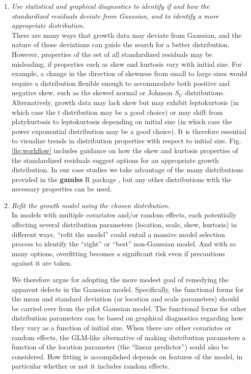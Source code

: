 \documentclass[12pt]{article}
\begin{document}
\begin{enumerate}
\item \textit{Use statistical and graphical diagnostics to identify if and how the standardized residuals deviate from Gaussian, and to identify a more appropriate distribution.}
\\
There are many ways that growth data may deviate from Gaussian, and the nature of those deviations can guide the search for a better distribution. 
However, properties of the set of all standardized residuals may be misleading, if properties such as skew and kurtosis vary with initial size. 
For example, a change in the direction of skewness from small to large sizes would require a distribution flexible enough to accommodate both positive and negative skew, such as the skewed normal or Johnson $S_{U}$ distributions. 
Alternatively, growth data may lack skew but may exhibit leptokurtosis (in which case the $t$ distribution may be a good choice) or may shift from platykurtosis to leptokurtosis depending on initial size (in which case the power exponential distribution may be a good choice). 
It is therefore essential to visualize trends in distribution properties with respect to initial size. 
Fig. \ref{fig:workflow} includes guidance on how the skew and kurtosis properties of the standardized residuals suggest options for 
an appropriate growth distribution. In our case studies we take advantage of the many distributions provided in the \textbf{gamlss} R package \citep{stasinopoulos2007generalized}, but any other distributions with the necessary properties can be used.  

\item \textit{Refit the growth model using the chosen distribution.}
\\
In models with multiple covariates and/or random effects, each potentially affecting several distribution parameters (location, scale, skew, kurtosis) in
different ways, ``refit the model'' could entail a massive model selection process to identify the ``right'' or ``best'' non-Gaussian model. 
And with so many options, overfitting becomes a significant risk even if precautions against it are taken. 

We therefore argue for adopting the more modest goal of remedying the apparent defects in the Gaussian model. Specifically, the functional forms
for the mean and standard deviation (or location and scale parameters) should be carried over from the pilot Gaussian model. The functional forms
for other distribution parameters can be based on graphical diagnostics regarding how they vary as a function of initial size. 
When there are other covariates or random effects, the GLM-like alternative of making distribution parameters a function of the location parameter (the ``linear predictor'') sould also be considered. 
How fitting is accomplished depends on features of the model, in particular whether or not it includes random effects. 


\end{enumerate}
\end{document}
